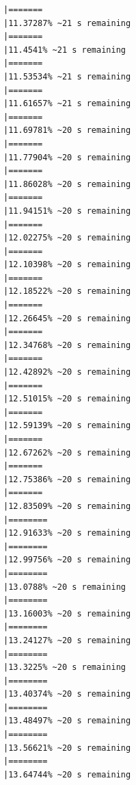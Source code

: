 \documentclass{article}\usepackage[]{graphicx}\usepackage[]{xcolor}
\makeatletter
\newenvironment{kframe}{%
 \def\at@end@of@kframe{}%
 \ifinner\ifhmode%
  \def\at@end@of@kframe{\end{minipage}}%
  \begin{minipage}{\columnwidth}%
 \fi\fi%
 \def\FrameCommand##1{\hskip\@totalleftmargin \hskip-\fboxsep
 \colorbox{shadecolor}{##1}\hskip-\fboxsep
     \hskip-\linewidth \hskip-\@totalleftmargin \hskip\columnwidth}%
 \MakeFramed {\advance\hsize-\width
   \@totalleftmargin\z@ \linewidth\hsize
   \@setminipage}}%
 {\par\unskip\endMakeFramed%
 \at@end@of@kframe}
\newenvironment{knitrout}{}{} %
\makeatother
\begin{document}
\begin{knitrout}
\begin{kframe}
\begin{verbatim}
|=======                                                       |11.37287% ~21 s remaining 
|=======                                                       |11.4541% ~21 s remaining  
|=======                                                       |11.53534% ~21 s remaining 
|=======                                                       |11.61657% ~21 s remaining 
|=======                                                       |11.69781% ~20 s remaining 
|=======                                                       |11.77904% ~20 s remaining 
|=======                                                       |11.86028% ~20 s remaining 
|=======                                                       |11.94151% ~20 s remaining 
|=======                                                       |12.02275% ~20 s remaining 
|=======                                                       |12.10398% ~20 s remaining 
|=======                                                       |12.18522% ~20 s remaining 
|=======                                                       |12.26645% ~20 s remaining 
|=======                                                       |12.34768% ~20 s remaining 
|=======                                                       |12.42892% ~20 s remaining 
|=======                                                       |12.51015% ~20 s remaining 
|=======                                                       |12.59139% ~20 s remaining 
|=======                                                       |12.67262% ~20 s remaining 
|=======                                                       |12.75386% ~20 s remaining 
|=======                                                       |12.83509% ~20 s remaining 
|========                                                      |12.91633% ~20 s remaining 
|========                                                      |12.99756% ~20 s remaining 
|========                                                      |13.0788% ~20 s remaining  
|========                                                      |13.16003% ~20 s remaining 
|========                                                      |13.24127% ~20 s remaining 
|========                                                      |13.3225% ~20 s remaining  
|========                                                      |13.40374% ~20 s remaining 
|========                                                      |13.48497% ~20 s remaining 
|========                                                      |13.56621% ~20 s remaining 
|========                                                      |13.64744% ~20 s remaining 

\end{verbatim}
\end{kframe}
\end{knitrout}
\end{document}
